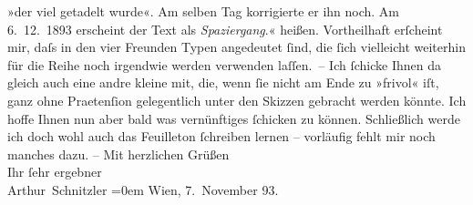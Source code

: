 \begin{ledgroupsized}[t]{13cm}
{{{                     »der viel getadelt wurde«. Am selben Tag korrigierte er ihn
                  noch. Am 6. 12. 1893 erscheint der Text als \emph{Spaziergang}.}}}\label{K_L00280_1h}« heißen. Vortheilhaft erſcheint mir, daſs
               in den vier Freunden \label{LL001-2v}Typen\label{LL001-2h} angedeutet
               ſind, die ſich vielleicht {\pb}weiterhin für die Reihe
               noch irgendwie werden verwenden laſſen. –\pend
           \pstart
           Ich ſchicke Ihnen da gleich auch eine andre kleine \label{K_L00280_2v}\label{K_L00280_2h} mit, die, wenn ſie nicht am Ende zu »frivol« iſt, ganz ohne Praetenſion
               gelegentlich unter den Skizzen gebracht werden könnte.\pend
           \pstart
           Ich hoffe Ihnen nun aber bald was vernünftiges ſchicken {\pb}zu können. \label{LL001-1v}Schließlich werde ich doch wohl auch das Feuilleton
                  ſchreiben lernen – vorläufig fehlt mir noch manches dazu\label{LL001-1h}.\pend
           \pstart
           – Mit herzlichen Grüßen{\\[\baselineskip]}Ihr ſehr ergebner{\\[\baselineskip]}\spacefill\mbox{Arthur Schnitzler}\pend
           \leftskip=0em{}\pstart
           Wien, 7. November
                     93.\pend
           
         
         \endnumbering{}\end{ledgroupsized}  \newcommand{\dateiname}{L00280}\newcommand{\titel}{Arthur Schnitzler an Hermann Bahr, 7. 11. 1893}\newcommand{\editorInnen}{ Kurt Ifkovits,  Martin Anton Müller}
      